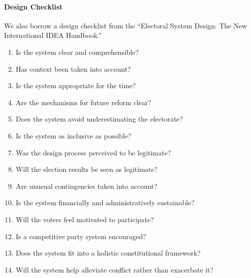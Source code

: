 \paragraph{Design Checklist}
We also borrow a design checklist from the ``Electoral System Design: The New
International IDEA Handbook.''

\begin{enumerate}[label=\Large$\square$]
  \item Is the system clear and comprehensible?
  \item Has context been taken into account?
  \item Is the system appropriate for the time?
  \item Are the mechanisms for future reform clear?
  \item Does the system avoid underestimating the electorate?
  \item Is the system as inclusive as possible?
  \item Was the design process perceived to be legitimate?
  \item Will the election results be seen as legitimate?
  \item Are unusual contingencies taken into account?
  \item Is the system financially and administratively sustainable?
  \item Will the voters feel motivated to participate?
  \item Is a competitive party system encouraged?
  \item Does the system fit into a holistic constitutional framework?
  \item Will the system help alleviate conflict rather than exacerbate it?
\end{enumerate}
